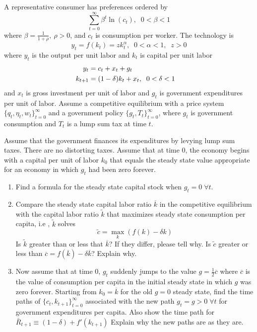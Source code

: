 \documentclass{article}
\begin{document}
\noindent
 A representative consumer has preferences ordered by
 $$ \sum_{t=0}^\infty \beta^t \ln (c_t), \;\;  0< \beta<1$$
 where $\beta = {\frac{1}{1+\rho}},\ \rho>0$, and $c_t$ is  consumption per worker.
The technology is $$ y_t=f(k_t)=zk_t^\alpha, \;\; 0<\alpha<1, \;\; z>0 $$
where $y_t$ is the output per unit labor and $k_t$ is capital per unit labor
\begin{align*}
y_t & =c_t+x_t+g_t \cr
  k_{t+1} & =(1-\delta)k_t+x_t, \;\;  0 < \delta<1 \cr
\end{align*}
and $x_t$ is  gross investment per unit of labor and $g_t$ is  government expenditures per unit of labor.
Assume a competitive equilibrium with a price system $\{q_t,\eta_t,w_t\}_{t=0}^\infty$ and a government policy $\{g_t,T_t\}_{t=0}^\infty$, where 
$g_t$ is government consumption and $T_t$ is a lump sum tax at time $t$.

 Assume that the government finances its expenditures by levying lump sum taxes. There are no distorting taxes. Assume that at time 0, the economy begins
 with a capital per unit of labor $k_0$ that equals the steady state value appropriate for an economy in which $g_t$ had been zero forever.
\begin{enumerate}[\bf a.]
	

\item 
Find a formula for the steady state capital stock when $g_t=0 \; \forall t$.
\item 
 Compare the steady state capital labor ratio $\overline{k}$ in the competitive equilibrium with the capital labor ratio $\tilde{k}$ that maximizes steady state consumption per capita, i.e ,
 $\tilde{k}$ solves $$\tilde{c}=\max_k \left( f(k)-\delta k \right) $$
Is $\tilde{k}$ greater than or less that $\overline{k}$? If they differ, please tell why. Is $\tilde{c}$ greater or less than $\overline{c} = f(\overline{k})-\delta  \overline{k}$? Explain why.
\item 
 Now assume that at time 0, $g_t$ suddenly jumps to the value $g={\frac{1}{2}}\overline{c}$ where
$\overline{c}$ is the value of consumption per capita in the initial steady state in which $g$ was zero forever. Starting from $k_0 = \overline{k}$ for the old $g=0$ steady state, find the time paths of $\{c_t,k_{t+1}\}_{t=0}^\infty$ associated with the new path $g_t=g>0 \; \forall t$ for government expenditures per capita.
Also show the time path for $\bar R_{t+1} \equiv (1-\delta) + f'(k_{t+1})$
Explain why the new paths are as they are.
\end{enumerate}
\end{document}
